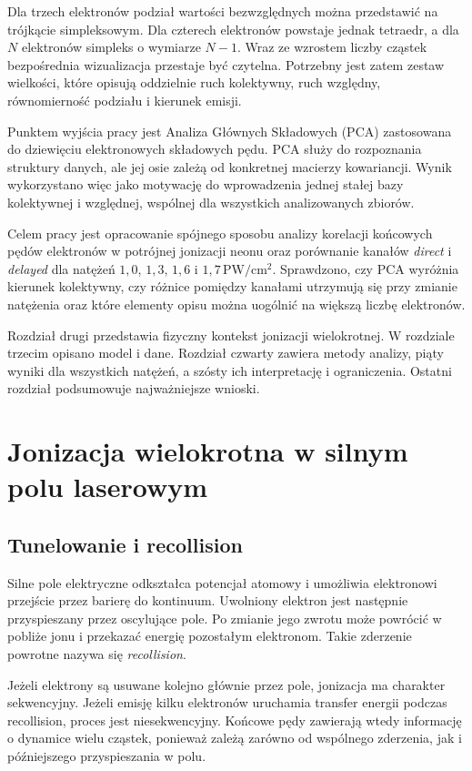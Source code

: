 \documentclass[12pt,letterpaper,oneside]{report}
\numberwithin{equation}{chapter}
\numberwithin{figure}{chapter}
\numberwithin{table}{chapter}
\newcommand{\direct}{\textit{direct}}
\newcommand{\delayed}{\textit{delayed}}
\begin{document}
Dla trzech elektronów podział wartości bezwzględnych można przedstawić na trójkącie simpleksowym. Dla czterech elektronów powstaje jednak tetraedr, a dla $N$ elektronów simpleks o wymiarze $N-1$. Wraz ze wzrostem liczby cząstek bezpośrednia wizualizacja przestaje być czytelna. Potrzebny jest zatem zestaw wielkości, które opisują oddzielnie ruch kolektywny, ruch względny, równomierność podziału i kierunek emisji.

Punktem wyjścia pracy jest Analiza Głównych Składowych (PCA) zastosowana do dziewięciu elektronowych składowych pędu. PCA służy do rozpoznania struktury danych, ale jej osie zależą od konkretnej macierzy kowariancji. Wynik wykorzystano więc jako motywację do wprowadzenia jednej stałej bazy kolektywnej i względnej, wspólnej dla wszystkich analizowanych zbiorów.

Celem pracy jest opracowanie spójnego sposobu analizy korelacji końcowych pędów elektronów w potrójnej jonizacji neonu oraz porównanie kanałów \direct{} i \delayed{} dla natężeń $1{,}0$, $1{,}3$, $1{,}6$ i $1{,}7\,\mathrm{PW/cm^2}$. Sprawdzono, czy PCA wyróżnia kierunek kolektywny, czy różnice pomiędzy kanałami utrzymują się przy zmianie natężenia oraz które elementy opisu można uogólnić na większą liczbę elektronów.

Rozdział drugi przedstawia fizyczny kontekst jonizacji wielokrotnej. W rozdziale trzecim opisano model i dane. Rozdział czwarty zawiera metody analizy, piąty wyniki dla wszystkich natężeń, a szósty ich interpretację i ograniczenia. Ostatni rozdział podsumowuje najważniejsze wnioski.


\chapter{Jonizacja wielokrotna w silnym polu laserowym}

\section{Tunelowanie i recollision}

Silne pole elektryczne odkształca potencjał atomowy i umożliwia elektronowi przejście przez barierę do kontinuum. Uwolniony elektron jest następnie przyspieszany przez oscylujące pole. Po zmianie jego zwrotu może powrócić w pobliże jonu i przekazać energię pozostałym elektronom. Takie zderzenie powrotne nazywa się \textit{recollision}.

Jeżeli elektrony są usuwane kolejno głównie przez pole, jonizacja ma charakter sekwencyjny. Jeżeli emisję kilku elektronów uruchamia transfer energii podczas recollision, proces jest niesekwencyjny. Końcowe pędy zawierają wtedy informację o dynamice wielu cząstek, ponieważ zależą zarówno od wspólnego zderzenia, jak i późniejszego przyspieszania w polu.
\end{document}
